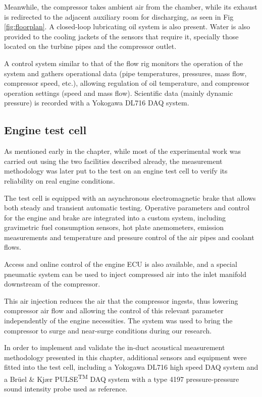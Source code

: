 Meanwhile, the compressor takes ambient air from the chamber, while its exhaust is redirected to the adjacent auxiliary room for discharging, as seen in Fig \ref{fig:floorplan}. A closed-loop lubricating oil system is also present. Water is also provided to the cooling jackets of the sensors that require it, specially those located on the turbine pipes and the compressor outlet.

A control system similar to that of the flow rig monitors the operation of the system and gathers operational data (pipe temperatures, pressures, mass flow, compressor speed, etc.), allowing regulation of oil temperature, and compressor operation settings (speed and mass flow). Scientific data (mainly dynamic pressure) is recorded with a Yokogawa DL716 DAQ system.

\subsection{Engine test cell} \label{sub:engine_cell}

As mentioned early in the chapter, while most of the experimental work was carried out using the two facilities described already, the measurement methodology was later put to the test on an engine test cell to verify its reliability on real engine conditions.

The test cell is equipped with an asynchronous electromagnetic brake that allows both steady and transient automatic testing. Operative parameters and control for the engine and brake are integrated into a custom system, including gravimetric fuel consumption sensors, hot plate anemometers, emission measurements and temperature and pressure control of the air pipes and coolant flows.

Access and online control of the engine ECU is also available, and a special pneumatic system can be used to inject compressed air into the inlet manifold downstream of the compressor.

This air injection reduces the air that the compressor ingests, thus lowering compressor air flow and allowing the control of this relevant parameter independently of the engine necessities. The system was used to bring the compressor to surge and near-surge conditions during our research.

In order to implement and validate the in-duct acoustical measurement methodology presented in this chapter, additional sensors and equipment were fitted into the test cell, including a Yokogawa DL716 high speed DAQ system and a Brüel \& Kjær PULSE\textsuperscript{TM} DAQ system with a type 4197 pressure-pressure sound intensity probe used as reference.

